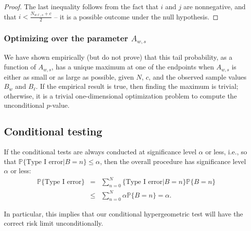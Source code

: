 \begin{proof}
The last inequality follows from the fact that $i$ and $j$ are nonnegative, and 
that $i < \frac{N_{w\ell,s}+c}{2}$ -- it is a possible outcome under the null hypothesis.




\end{proof}


\subsubsection{Optimizing over the parameter $A_{w,s}$}

We have shown empirically (but do not prove) that this tail probability, as a function of $A_{w,s}$,
has a unique maximum at one of the endpoints when $A_{w,s}$ is either as small or as large as possible,
given $N$, $c$, and the observed sample values $B_w$ and $B_\ell$.
If the empirical result is true, then finding the maximum is trivial;
otherwise, it is a trivial one-dimensional optimization problem to compute the unconditional $p$-value.

\subsection{Conditional testing}
If the conditional tests are always conducted at significance level $\alpha$ or less, i.e., so that
$\mathbb{P} \{\mbox{Type I error} | B = n\} \le \alpha$, then the
overall procedure has significance level $\alpha$ or less:
\begin{eqnarray}
    \mathbb{P} \{\mbox{Type I error}\} &=& \sum_{n=0}^N \{\mbox{Type I error} |  B = n\} \mathbb{P} \{ B = n \} \nonumber \\
       & \le & \sum_{n=0}^N \alpha \mathbb{P} \{  B = n \}  =  \alpha.
\end{eqnarray}

In particular, this implies that our conditional hypergeometric test will have the correct risk limit unconditionally.
